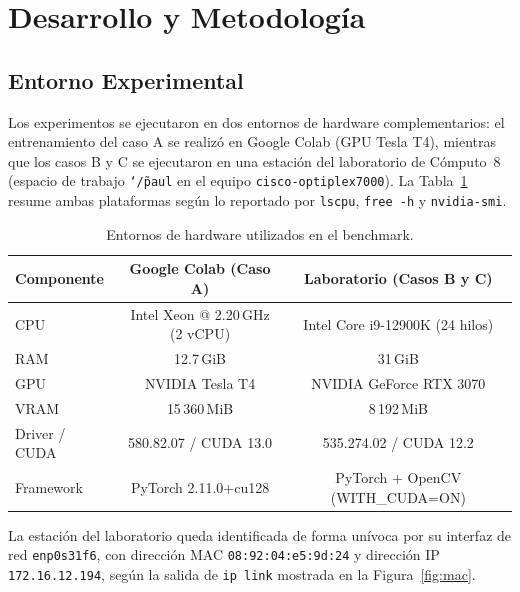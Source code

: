 \section{Desarrollo y Metodología}

\subsection{Entorno Experimental}

Los experimentos se ejecutaron en dos entornos de hardware complementarios: el
entrenamiento del caso A se realizó en Google Colab (GPU Tesla T4), mientras
que los casos B y C se ejecutaron en una estación del laboratorio de Cómputo~8
(espacio de trabajo \texttt{\char`\~/paul} en el equipo
\texttt{cisco-optiplex7000}). La Tabla~\ref{tab:hardware} resume ambas
plataformas según lo reportado por \texttt{lscpu}, \texttt{free -h} y
\texttt{nvidia-smi}.

\begin{table}[H]
\centering
\caption{Entornos de hardware utilizados en el benchmark.}
\label{tab:hardware}
\setlength{\tabcolsep}{6pt}
\begin{tabular}{lcc}
  \toprule
  \textbf{Componente} & \textbf{Google Colab (Caso A)} & \textbf{Laboratorio (Casos B y C)} \\
  \midrule
  CPU              & Intel Xeon @ 2.20\,GHz (2 vCPU) & Intel Core i9-12900K (24 hilos) \\
  RAM              & 12.7\,GiB                        & 31\,GiB \\
  GPU              & NVIDIA Tesla T4                  & NVIDIA GeForce RTX 3070 \\
  VRAM             & 15\,360\,MiB                     & 8\,192\,MiB \\
  Driver / CUDA    & 580.82.07 / CUDA 13.0            & 535.274.02 / CUDA 12.2 \\
  Framework        & PyTorch 2.11.0+cu128             & PyTorch + OpenCV (WITH\_CUDA=ON) \\
  \bottomrule
\end{tabular}
\end{table}

La estación del laboratorio queda identificada de forma unívoca por su interfaz
de red \texttt{enp0s31f6}, con dirección MAC \texttt{08:92:04:e5:9d:24} y
dirección IP \texttt{172.16.12.194}, según la salida de \texttt{ip link}
mostrada en la Figura~\ref{fig:mac}.

